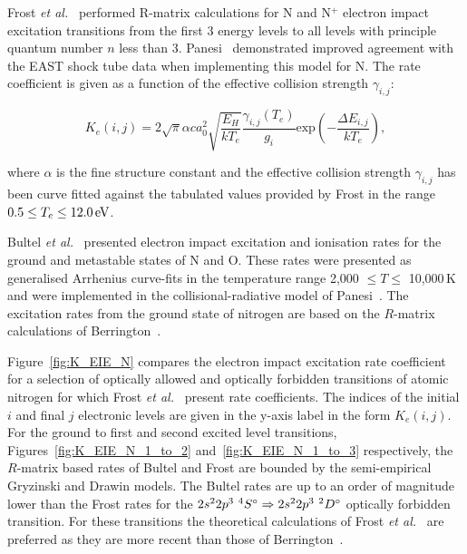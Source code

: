 {Frost \textit{et al.}~\cite{FAS+1998} performed R-matrix calculations for N and N$^+$ electron impact excitation transitions from the first 3 energy levels to all levels with principle quantum number $n$ less than 3.
Panesi~\cite{panesi_2008B} demonstrated improved agreement with the EAST shock tube data when implementing this model for N.
The rate coefficient is given as a function of the effective collision strength $\gamma_{i,j}$:

\begin{equation}
 K_e (i,j) = 2 \sqrt{\pi} \alpha c a_{0}^2 \sqrt{\frac{E_H}{kT_e}} \frac{\gamma_{i,j}(T_{e})}{g_i} \text{exp} \left ( - \frac{\Delta E_{i,j}}{kT_e} \right ),
\end{equation}

\noindent where $\alpha$ is the fine structure constant and the effective collision strength $\gamma_{i,j}$ has been curve fitted against the tabulated values provided by Frost in the range $0.5 \leq T_e \leq 12.0\text{\,eV}$.

\par

Bultel \textit{et al.}~\cite{BBB+2006} presented electron impact excitation and ionisation rates for the ground and metastable states of N and O.
These rates were presented as generalised Arrhenius curve-fits in the temperature range 2,000 $\leq T \leq$ 10,000\,K and were implemented in the collisional-radiative model of Panesi~\cite{panesi_phd}.
The excitation rates from the ground state of nitrogen are based on the $R$-matrix calculations of Berrington~\cite{BBR1975}.

\par

Figure~\ref{fig:K_EIE_N} compares the electron impact excitation rate coefficient for a selection of optically allowed and optically forbidden transitions of atomic nitrogen for which Frost \textit{et al.}~\cite{FAS+1998} present rate coefficients.
The indices of the initial $i$ and final $j$ electronic levels are given in the y-axis label in the form $K_e(i,j)$.
For the ground to first and second excited level transitions, Figures~\ref{fig:K_EIE_N_1_to_2} and~\ref{fig:K_EIE_N_1_to_3} respectively, the $R$-matrix based rates of Bultel and Frost are bounded by the semi-empirical Gryzinski and Drawin models.
The Bultel rates are up to an order of magnitude lower than the Frost rates for the $2s^2 2p^3\text{ }^4S^\circ \Rightarrow 2s^2 2p^3 \text{ }^2D^\circ$ optically forbidden transition.
For these transitions the theoretical calculations of Frost \textit{et al.}~\cite{FAS+1998} are preferred as they are more recent than those of Berrington~\cite{BBR1975}.

}
